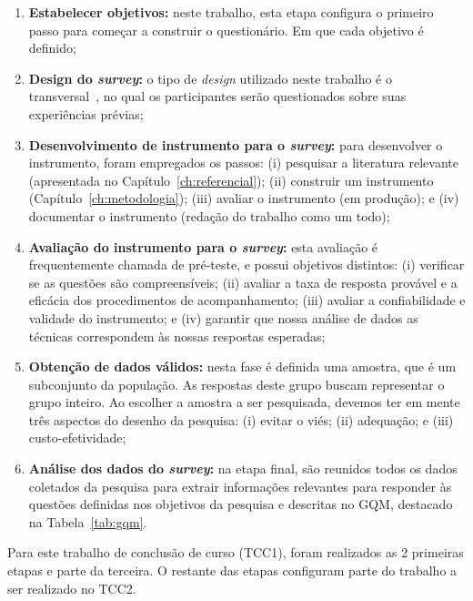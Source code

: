 \begin{enumerate}
\item \textbf{Estabelecer objetivos:} neste trabalho, esta etapa configura o primeiro passo para começar a construir o questionário. Em que cada objetivo é definido;

\item \textbf{Design do \textit{survey}:} o tipo de \textit{design} utilizado neste trabalho é o transversal~\cite{geras2004survey}, no qual os participantes serão questionados sobre suas experiências prévias;

\item \textbf{Desenvolvimento de instrumento para o \textit{survey}:} para desenvolver o instrumento, foram empregados os passos: (i) pesquisar a literatura relevante (apresentada no Capítulo~\ref{ch:referencial}); (ii) construir um instrumento (Capítulo~\ref{ch:metodologia}); (iii) avaliar o instrumento (em produção); e (iv) documentar o instrumento (redação do trabalho como um todo);

\item \textbf{Avaliação do instrumento para o \textit{survey}:} esta avaliação é frequentemente chamada de pré-teste, e possui objetivos distintos: (i) verificar se as questões são compreensíveis; (ii) avaliar a taxa de resposta provável e a eficácia dos procedimentos de acompanhamento; (iii) avaliar a confiabilidade e validade do instrumento; e (iv) garantir que nossa análise de dados as técnicas correspondem às nossas respostas esperadas;

\item \textbf{Obtenção de dados válidos:} nesta fase é definida uma amostra, que é um subconjunto da população. As respostas deste grupo buscam representar o grupo inteiro. Ao escolher a amostra a ser pesquisada, devemos ter em mente três aspectos do desenho da pesquisa: (i) evitar o viés; (ii) adequação; e (iii) custo-efetividade;

\item \textbf{Análise dos dados do \textit{survey}:} na etapa final, são reunidos todos os dados coletados da pesquisa para extrair informações relevantes para responder às questões definidas nos objetivos da pesquisa e descritas no GQM, destacado na Tabela~\ref{tab:gqm}.
\end{enumerate}

Para este trabalho de conclusão de curso (TCC1), foram realizados as 2 primeiras etapas e parte da terceira. O restante das etapas configuram parte do trabalho a ser realizado no TCC2.

